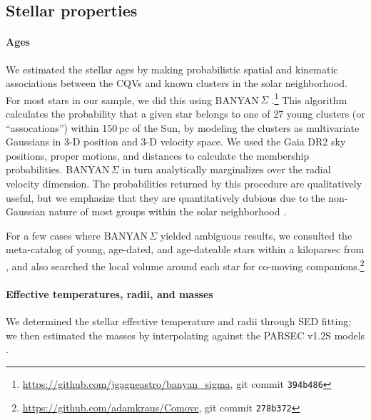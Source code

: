 \documentclass[11pt,twocolumn,tighten]{aastex63}
\begin{document}
\subsection{Stellar properties}
\label{subsec:starprops}

\paragraph{Ages}
We estimated the stellar ages by making probabilistic spatial and
kinematic associations between the CQVs and known clusters in the
solar neighborhood.  For most stars in our sample, we did this using
BANYAN\,$\Sigma$
\citep{2018ApJ...856...23G}.\footnote{\url{https://github.com/jgagneastro/banyan_sigma},
git commit \texttt{394b486}} This algorithm calculates the probability
that a given star belongs to one of 27 young clusters (or
``assocations'') within 150\,pc of the Sun, by modeling the clusters
as multivariate Gaussians in 3-D position and 3-D velocity space.  We
used the Gaia DR2 sky positions, proper motions, and distances to
calculate the membership probabilities.  BANYAN\,$\Sigma$ in turn
analytically marginalizes over the radial velocity dimension.  The
probabilities returned by this procedure are qualitatively useful, but
we emphasize that they are quantitatively dubious due to the
non-Gaussian nature of most groups within the solar neighborhood
\citep[see e.g.][Figure~10]{2021ApJ...917...23K}.

For a few cases where BANYAN\,$\Sigma$ yielded ambiguous results, we
consulted the meta-catalog of young, age-dated, and age-dateable stars
within a kiloparsec from \citet{2022AJ....163..121B}, and also
searched the local volume around each star for co-moving
companions.\footnote{\url{https://github.com/adamkraus/Comove}, git
commit \texttt{278b372}}


\paragraph{Effective temperatures, radii, and masses}

We determined the stellar effective temperature and radii through SED
fitting; we then estimated the masses by interpolating against
the PARSEC v1.2S models \citep{2012MNRAS.427..127B,2014MNRAS.444.2525C}.
\end{document}

